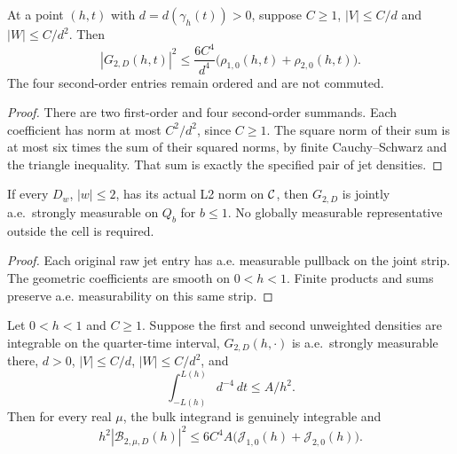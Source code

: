 \begin{lemma}
\label{lem:second-level-density-bound}
\leanok
At a point $(h,t)$ with $d=d(\gamma_h(t))>0$, suppose $C\ge1$,
$|V|\le C/d$ and $|W|\le C/d^2$. Then
\[
 |G_{2,D}(h,t)|^2\le \frac{6C^4}{d^4}
       \bigl(\rho_{1,0}(h,t)+\rho_{2,0}(h,t)\bigr).
\]
The four second-order entries remain ordered and are not commuted.
\end{lemma}

\begin{proof}
\leanok
There are two first-order and four second-order summands.
Each coefficient has norm at most $C^2/d^2$, since $C\ge1$.
The square norm of their sum is at most six times the sum of
their squared norms, by finite Cauchy--Schwarz and the triangle inequality.
That sum is exactly the specified pair of jet densities.
\end{proof}

\begin{lemma}
\label{lem:second-level-measurable}
\leanok
If every $D_w$, $|w|\le2$, has its actual L2 norm on $\mathcal{C}$,
then $G_{2,D}$ is jointly a.e.\ strongly measurable on $Q_b$ for $b\le1$.
No globally measurable representative outside the cell is required.
\end{lemma}

\begin{proof}
\leanok
Each original raw jet entry has a.e. measurable pullback on the joint strip.
The geometric coefficients are smooth on $0<h<1$.
Finite products and sums preserve a.e. measurability on this same strip.
\end{proof}

\begin{lemma}
\label{lem:second-numerator-bulk-bound}
\leanok
Let $0<h<1$ and $C\ge1$. Suppose the first and second unweighted
densities are integrable on the quarter-time interval,
$G_{2,D}(h,\cdot)$ is a.e.\ strongly measurable there,
$d>0$, $|V|\le C/d$, $|W|\le C/d^2$, and
\[
 \int_{-L(h)}^{L(h)}d^{-4}\,dt\le A/h^2.
\]
Then for every real $\mu$, the bulk integrand is genuinely integrable and
\[
 h^2|\mathcal B_{2,\mu,D}(h)|^2
 \le6C^4A\bigl(\mathcal J_{1,0}(h)+\mathcal J_{2,0}(h)\bigr).
\]
\end{lemma}

